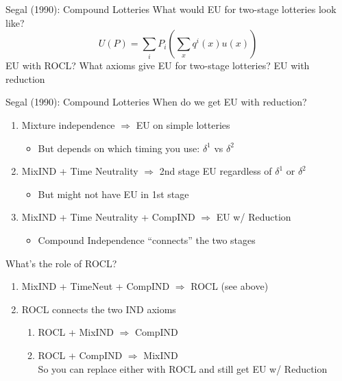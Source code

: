 \begin{frame}{Segal (1990): Compound Lotteries}
What would EU for two-stage lotteries look like?
$$
    U(P) = \sum_i P_i \left(\sum_x q^i(x) u(x)\right)
$$
 \br
 EU with ROCL?
 \br
 What axioms give EU for two-stage lotteries? EU with reduction
\end{frame}

\begin{frame}{Segal (1990): Compound Lotteries}
When do we get EU with reduction?
\begin{enumerate}
    \item Mixture independence $\Rightarrow$ EU on simple lotteries
    \begin{itemize}
        \item But depends on which timing you use: $\delta^1$ vs $\delta^2$
    \end{itemize}
    \item MixIND + Time Neutrality $\Rightarrow$ 2nd stage EU regardless of $\delta^1$ or $\delta^2$
    \begin{itemize}
        \item But might not have EU in 1st stage
    \end{itemize}
    \item MixIND + Time Neutrality + CompIND $\Rightarrow$ EU w/ Reduction
    \begin{itemize}
        \item Compound Independence ``connects'' the two stages
    \end{itemize}
\end{enumerate}
\br
What's the role of ROCL?
\begin{enumerate}
    \item MixIND + TimeNeut + CompIND $\Rightarrow$ ROCL (see above)
    \item ROCL connects the two IND axioms
    \begin{enumerate}
        \item ROCL + MixIND $\Rightarrow$ CompIND
        \item ROCL + CompIND $\Rightarrow$ MixIND\\
        So you can replace either with ROCL and still get EU w/ Reduction
    \end{enumerate}
\end{enumerate}
\end{frame}

